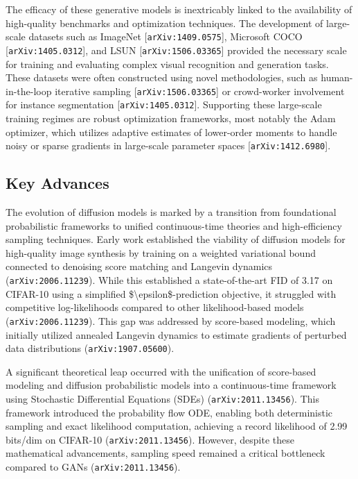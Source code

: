 \documentclass[11pt]{article}
\begin{document}
The efficacy of these generative models is inextricably linked to the availability of high-quality benchmarks and optimization techniques. The development of large-scale datasets such as ImageNet [\texttt{arXiv:1409.0575}], Microsoft COCO [\texttt{arXiv:1405.0312}], and LSUN [\texttt{arXiv:1506.03365}] provided the necessary scale for training and evaluating complex visual recognition and generation tasks. These datasets were often constructed using novel methodologies, such as human-in-the-loop iterative sampling [\texttt{arXiv:1506.03365}] or crowd-worker involvement for instance segmentation [\texttt{arXiv:1405.0312}]. Supporting these large-scale training regimes are robust optimization frameworks, most notably the Adam optimizer, which utilizes adaptive estimates of lower-order moments to handle noisy or sparse gradients in large-scale parameter spaces [\texttt{arXiv:1412.6980}].

\subsection{Key Advances}

The evolution of diffusion models is marked by a transition from foundational probabilistic frameworks to unified continuous-time theories and high-efficiency sampling techniques. Early work established the viability of diffusion models for high-quality image synthesis by training on a weighted variational bound connected to denoising score matching and Langevin dynamics (\texttt{arXiv:2006.11239}). While this established a state-of-the-art FID of 3.17 on CIFAR-10 using a simplified \$\textbackslash{}epsilon\$-prediction objective, it struggled with competitive log-likelihoods compared to other likelihood-based models (\texttt{arXiv:2006.11239}). This gap was addressed by score-based modeling, which initially utilized annealed Langevin dynamics to estimate gradients of perturbed data distributions (\texttt{arXiv:1907.05600}).

A significant theoretical leap occurred with the unification of score-based modeling and diffusion probabilistic models into a continuous-time framework using Stochastic Differential Equations (SDEs) (\texttt{arXiv:2011.13456}). This framework introduced the probability flow ODE, enabling both deterministic sampling and exact likelihood computation, achieving a record likelihood of 2.99 bits/dim on CIFAR-10 (\texttt{arXiv:2011.13456}). However, despite these mathematical advancements, sampling speed remained a critical bottleneck compared to GANs (\texttt{arXiv:2011.13456}).
\end{document}
